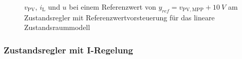 \begin{figure}[H]
    \centering
    \caption[Validierung Regler mit Vorsteuerung (linear)]{$v_{\mathrm{PV}}$, $i_{\mathrm{L}}$ und $u$ bei einem Referenzwert von $y_{ref} = v_{\mathrm{PV,MPP}} + \SI{10}{V}$ am Zustandsregler mit Referenzwertvorsteuerung für das lineare Zustandsraummodell}
    \label{fig:Bild16}
\end{figure}

\subsubsection{Zustandsregler mit I-Regelung}

